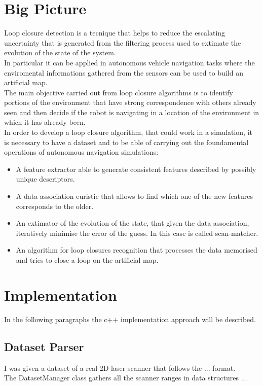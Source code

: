 \section{Big Picture}

Loop closure detection is a tecnique that helps to reduce the escalating uncertainty that is generated from the filtering process used to extimate the evolution of the state of the system.\\ In particular it can be applied in autonomous vehicle navigation tasks where the enviromental informations gathered from the sensors can be used to build an artificial map.\\
The main objective carried out from loop closure algorithms is to identify portions of the environment that have strong correspondence with others already seen and then decide if the robot is navigating in a location of the environment in which it has already  been.\\
In order to develop a loop closure algorithm, that could work in a simulation, it is necessary to have a dataset and to be able of carrying out the foundamental operations of autonomous navigation simulations:
\begin{itemize}
  \item A feature extractor able to generate consistent features described by possibly unique descriptors.
   \item A data association euristic that allows to find which one of the new features corresponds to the older.
   \item An extimator of the evolution of the state, that given the data association, iteratively minimise the error of the guess. In this case is called scan-matcher.
     \item An algorithm for loop closures recognition that processes the data memorised and tries to close a loop on the artificial map.
\end{itemize}

\section{ Implementation}
In the following paragraphs the c++ implementation approach will be described.
\subsection{ Dataset Parser}
I was given a dataset of a real 2D laser scanner that follows the ... format.\\ The DatasetManager class gathers all the scanner ranges in data structures ...
